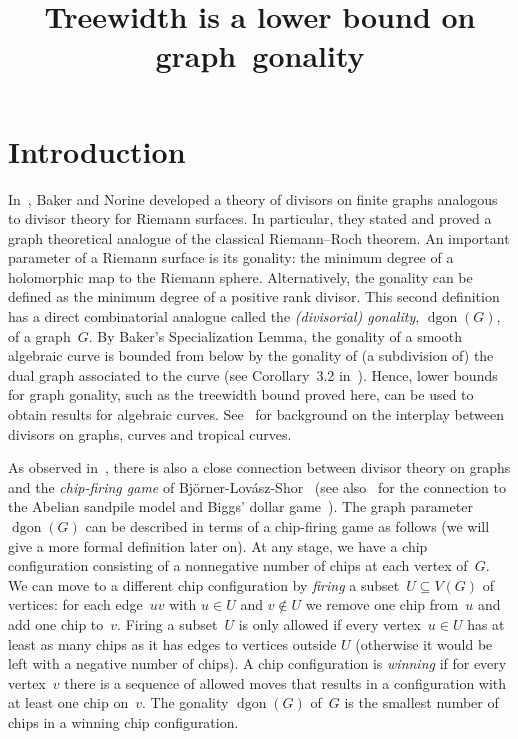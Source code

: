 \documentclass[ALCO,ThmDefs,Unicode,epreuves]{cedram}
\author{\firstname{Josse} \lastname{van Dobben de Bruyn}}
\author{\firstname{Dion} \lastname{Gijswijt}}
\title[Treewidth is a lower bound on graph gonality]{Treewidth is a lower bound on graph~gonality}
\DeclareMathOperator{\dgon}{dgon}
\begin{document}
\maketitle


\section{Introduction}



In~\cite{BakerNorine2007}, Baker and Norine developed a theory of divisors on finite graphs analogous to divisor theory for Riemann surfaces. In particular, they stated and proved a graph theoretical analogue of the classical Riemann--Roch theorem. An important parameter of a Riemann surface is its gonality: the minimum degree of a holomorphic map to the Riemann sphere. Alternatively, the gonality can be defined as the minimum degree of a positive rank divisor. This second definition has a direct combinatorial analogue called the \emph{(divisorial) gonality}, $\dgon(G)$, of a graph~$G$. By Baker's Specialization Lemma, the gonality of a smooth algebraic curve is bounded from below by the gonality of (a subdivision of) the dual graph associated to the curve (see Corollary~3.2 in~\cite{Baker2008}). Hence, lower bounds for graph gonality, such as the treewidth bound proved here, can be used to obtain results for algebraic curves. See~\cite{Baker2008, CornelissenKatoKool2012, HKN} for background on the interplay between divisors on graphs, curves and tropical curves. 

As observed in~\cite{BakerNorine2007}, there is also a close connection between divisor theory on graphs and the \emph{chip-firing game} of Bj{\"o}rner-Lov{\'a}sz-Shor~\cite{BLS1991} (see also~\cite{Merino} for the connection to the Abelian sandpile model and Biggs' dollar game~\cite{Biggs}). The graph parameter~$\dgon(G)$ can be described in terms of a chip-firing game as follows (we will give a more formal definition later on). At any stage, we have a chip configuration consisting of a nonnegative number of chips at each vertex of~$G$. We can move to a different chip configuration by \emph{firing} a subset~$U\subseteq V(G)$ of vertices: for each edge~$uv$ with $u\in U$ and $v\not\in U$ we remove one chip from~$u$ and add one chip to~$v$. Firing a subset~$U$ is only allowed if every vertex~$u\in U$ has at least as many chips as it has edges to vertices outside $U$ (otherwise it would be left with a negative number of chips). A chip configuration is \emph{winning} if for every vertex~$v$ there is a sequence of allowed moves that results in a configuration with at least one chip on~$v$. The gonality $\dgon(G)$ of~$G$ is the smallest number of chips in a winning chip configuration.
\end{document}
